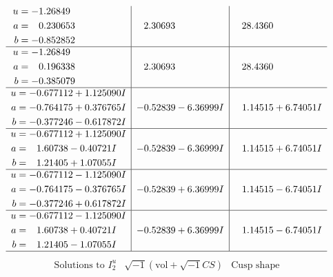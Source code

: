 \documentclass[1p]{elsarticle_modified}
\theoremstyle{definition}
\newcommand{\I}{\sqrt{-1}}
\begin{document}
$$\begin{array}{c|c|c}
\begin{aligned}
u &= -1.26849\phantom{ +0.000000I} \\
a &= \phantom{-}0.230653\phantom{ +0.000000I} \\
b &= -0.852852\phantom{ +0.000000I}\end{aligned}
 & \phantom{-}2.30693\phantom{ +0.000000I} & \phantom{-}28.4360\phantom{ +0.000000I} \\ \hline\begin{aligned}
u &= -1.26849\phantom{ +0.000000I} \\
a &= \phantom{-}0.196338\phantom{ +0.000000I} \\
b &= -0.385079\phantom{ +0.000000I}\end{aligned}
 & \phantom{-}2.30693\phantom{ +0.000000I} & \phantom{-}28.4360\phantom{ +0.000000I} \\ \hline\begin{aligned}
u &= -0.677112 + 1.125090 I \\
a &= -0.764175 + 0.376765 I \\
b &= -0.377246 - 0.617872 I\end{aligned}
 & -0.52839 - 6.36999 I & \phantom{-}1.14515 + 6.74051 I \\ \hline\begin{aligned}
u &= -0.677112 + 1.125090 I \\
a &= \phantom{-}1.60738 - 0.40721 I \\
b &= \phantom{-}1.21405 + 1.07055 I\end{aligned}
 & -0.52839 - 6.36999 I & \phantom{-}1.14515 + 6.74051 I \\ \hline\begin{aligned}
u &= -0.677112 - 1.125090 I \\
a &= -0.764175 - 0.376765 I \\
b &= -0.377246 + 0.617872 I\end{aligned}
 & -0.52839 + 6.36999 I & \phantom{-}1.14515 - 6.74051 I \\ \hline\begin{aligned}
u &= -0.677112 - 1.125090 I \\
a &= \phantom{-}1.60738 + 0.40721 I \\
b &= \phantom{-}1.21405 - 1.07055 I\end{aligned}
 & -0.52839 + 6.36999 I & \phantom{-}1.14515 - 6.74051 I\\
 \hline 
 \end{array}$$\newpage$$\begin{array}{c|c|c}  
\text{Solutions to }I^u_{2}& \I (\text{vol} + \sqrt{-1}CS) & \text{Cusp shape}\\

\end{array}$$
\end{document}
